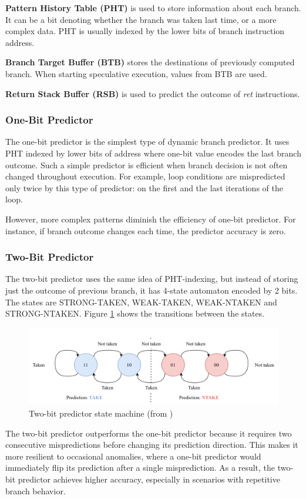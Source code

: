 \textbf{Pattern History Table (PHT)} is used to store information about each branch. It can be a bit denoting whether the branch was taken last time, or a more complex data. PHT is usually indexed by the lower bits of branch instruction address.

\textbf{Branch Target Buffer (BTB)} stores the destinations of previously computed branch. When starting speculative execution, values from BTB are used.

\textbf{Return Stack Buffer (RSB)} is used to predict the outcome of \textit{ret} instructions.

\subsubsection{One-Bit Predictor}

The one-bit predictor is the simplest type of dynamic branch predictor. It uses PHT indexed by lower bits of address where one-bit value encodes the last branch outcome. Such a simple predictor is efficient when branch decision is not often changed throughout execution. For example, loop conditions are mispredicted only twice by this type of predictor: on the first and the last iterations of the loop.

However, more complex patterns diminish the efficiency of one-bit predictor. For instance, if branch outcome changes each time, the predictor accuracy is zero.

\subsubsection{Two-Bit Predictor}

The two-bit predictor uses the same idea of PHT-indexing, but instead of storing just the outcome of previous branch, it has 4-state automaton encoded by 2 bits. The states are STRONG-TAKEN, WEAK-TAKEN, WEAK-NTAKEN and STRONG-NTAKEN. Figure \ref{fig:two-bit-counter} shows the transitions between the states.

\begin{figure}[H]
    \includegraphics[width=\textwidth]{figures/two-bit-counter.png}
    \caption{Two-bit predictor state machine (from \cite{mahling_reverse_2023})}
    \label{fig:two-bit-counter}
\end{figure}

The two-bit predictor outperforms the one-bit predictor because it requires two consecutive mispredictions before changing its prediction direction. This makes it more resilient to occasional anomalies, where a one-bit predictor would immediately flip its prediction after a single misprediction. As a result, the two-bit predictor achieves higher accuracy, especially in scenarios with repetitive branch behavior.


